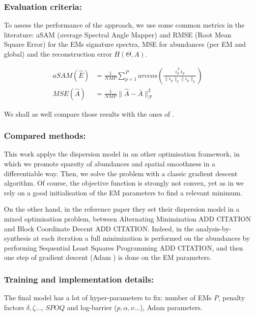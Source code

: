 \documentclass{article}
\begin{document}
\subsubsection{Evaluation criteria:}
To assess the performance of the approach, we use some common metrics in the literature: aSAM (average Spectral Angle Mapper) and RMSE (Root Mean Square Error) for the EMs signature spectra, MSE for abundances (per EM and global) and the reconstruction error $H(\Theta, A)$.

\begin{align*}
  aSAM(\widehat{E}) &= \frac{1}{N M P} \sum_{p=1}^P arccos \left( \frac{\widehat{\epsilon}_p^T\ \bar{\epsilon}_p}{\| \widehat{\epsilon}_p \|_2 \| \bar{\epsilon}_p \|_2} \right)\\
  MSE(\widehat{A}) &= \frac{1}{N M P} \| \widehat{A} - \bar{A} \|_{\mathcal{F}}^2
\end{align*}

We shall as well compare those results with the ones of \citet{janiczek_differentiable_2020}.

\subsubsection{Compared methods:}
This work applys the dispersion model in an other optimisation framework, in which we promote sparsity of abundances and spatial smoothness in a differentiable way. Then, we solve the problem with a classic gradient descent algorithm. Of course, the objective function is strongly not convex, yet as in \citet{janiczek_differentiable_2020} we rely on a good initialisation of the EM parameters to find a relevant minimum.

On the other hand, in the reference paper they set their dispersion model in a mixed optimisation problem, between Alternating Minimization ADD CITATION and Block Coordinate Decent ADD CITATION. Indeed, in the analysis-by-synthesis at each iteration a full minimization is performed on the abundances by performing Sequential Least Squares Programming ADD CITATION, and then one step of gradient descent (Adam \citep{kingma_adam_2017}) is done on the EM parameters.

\subsubsection{Training and implementation details:}
The final model has a lot of hyper-parameters to fix: number of EMs $P$, penalty factors $\delta, \zeta...$, $SPOQ$ and log-barrier ($p, \alpha, \nu...$), Adam parameters.
\end{document}
